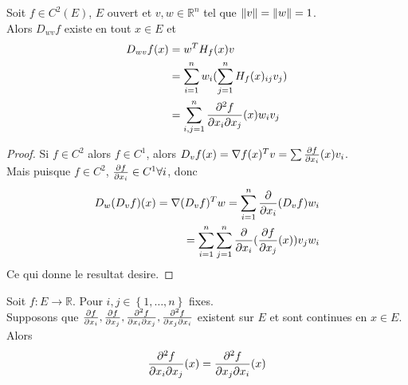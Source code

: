 \documentclass[../main.tex]{subfiles}
\begin{document}
\begin{lemma}
	Soit $f\in C^2( E) $, $E$ ouvert et $v ,w \in \mathbb{R}^n$ tel que $\left\lVert v\right\rVert = \left\lVert w\right\rVert =1$.\\ Alors $D_{wv} f $ existe en tout $x \in E$ et
	\begin{align*}
		D_{wv} f( x)  &= w^{T} H_f( x) v\\
			      &= \sum_{i=1}^{ n}w_i ( \sum_{j=1}^{ n}H_f( x)_{ij} v_j)\\
			      &= \sum_{i,j=1}^{ n} \frac{\partial ^{2} f}{\partial x_i \partial x_j} ( x)  w_i v_j
	\end{align*}
	
\end{lemma}
\begin{proof}
	Si $f \in C^{2}$ alors $f \in C^{1}$, alors $D_v f( x) = \nabla f ( x) ^{T} v = \sum \frac{\partial f}{\partial x_i}( x) v_i $.\\
	Mais puisque $f \in C^{2}$, $\frac{\partial f}{\partial x_i}\in C^{1}\forall i$, donc
	\begin{align*}
	D_w ( D_v f) ( x)  = \nabla ( D_v f) ^{T} w = \sum_{i=1}^{ n} \frac{\partial }{\partial x_i }( D_v f)  w_i\\
	= \sum_{i=1}^{ n} \sum_{j=1}^{ n} \frac{\partial }{\partial x_i} ( \frac{\partial f}{\partial x_j} ( x) ) v_j w_i
	\end{align*}
	Ce qui donne le resultat desire.
	
\end{proof}
\begin{thm}
	Soit $f: E \to \mathbb{R}$. Pour $i,j \in \left\{ 1, \ldots, n \right\}  $ fixes.\\
Supposons que $\frac{\partial f}{\partial x_i}, \frac{\partial f}{\partial x_j}, \frac{\partial ^{2} f}{\partial x_i \partial x_j}, \frac{\partial ^{2} f}{\partial x_j \partial x_i}$ existent sur $E$ et sont continues en $x \in E$. Alors
\[ 
	\frac{\partial ^{2}f}{\partial x_i \partial x_j }( x)  = \frac{\partial ^{2} f}{\partial x_j \partial x_i}( x) 
\]
\end{thm}


	
\end{document}
